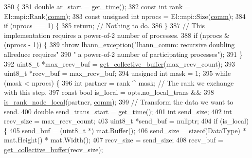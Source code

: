 \begin{DoxyCode}
380                                           \{
381   \textcolor{keywordtype}{double} ar\_start = \hyperlink{namespacelbann_a478d36031ff0659893c4322cd856157f}{get\_time}();
382   \textcolor{keyword}{const} \textcolor{keywordtype}{int} rank = El::mpi::Rank(\hyperlink{file__io_8cpp_ab048c6f9fcbcfaa57ce68b00263dbebe}{comm});
383   \textcolor{keyword}{const} \textcolor{keywordtype}{unsigned} \textcolor{keywordtype}{int} nprocs = El::mpi::Size(\hyperlink{file__io_8cpp_ab048c6f9fcbcfaa57ce68b00263dbebe}{comm});
384   \textcolor{keywordflow}{if} (nprocs == 1) \{
385     \textcolor{keywordflow}{return};  \textcolor{comment}{// Nothing to do.}
386   \}
387   \textcolor{comment}{// This implementation requires a power-of-2 number of processes.}
388   \textcolor{keywordflow}{if} (nprocs & (nprocs - 1)) \{
389     \textcolor{keywordflow}{throw} lbann\_exception(\textcolor{stringliteral}{"lbann\_comm: recursive doubling allreduce requires"}
390                           \textcolor{stringliteral}{" a power-of-2 number of participating processes"});
391   \}
392   uint8\_t *max\_recv\_buf = \hyperlink{classlbann_1_1lbann__comm_ae925ac5eaf2895717c709b252961b3bf}{get\_collective\_buffer}(max\_recv\_count);
393   uint8\_t *recv\_buf = max\_recv\_buf;
394   \textcolor{keywordtype}{unsigned} \textcolor{keywordtype}{int} mask = 1;
395   \textcolor{keywordflow}{while} (mask < nprocs) \{
396     \textcolor{keywordtype}{int} partner = rank ^ mask;  \textcolor{comment}{// The rank we exchange with this step.}
397     \textcolor{keyword}{const} \textcolor{keywordtype}{bool} is\_local = opts.no\_local\_trans &&
398                           \hyperlink{classlbann_1_1lbann__comm_a5cdd318d1505ba0f31bf4fe9fadffacc}{is\_rank\_node\_local}(partner, \hyperlink{file__io_8cpp_ab048c6f9fcbcfaa57ce68b00263dbebe}{comm});
399     \textcolor{comment}{// Transform the data we want to send.}
400     \textcolor{keywordtype}{double} send\_trans\_start = \hyperlink{namespacelbann_a478d36031ff0659893c4322cd856157f}{get\_time}();
401     \textcolor{keywordtype}{int} send\_size;
402     \textcolor{keywordtype}{int} recv\_size = max\_recv\_count;
403     uint8\_t *send\_buf = \textcolor{keyword}{nullptr};
404     \textcolor{keywordflow}{if} (is\_local) \{
405       send\_buf = (uint8\_t *) mat.Buffer();
406       send\_size = \textcolor{keyword}{sizeof}(DataType) * mat.Height() * mat.Width();
407       recv\_size = send\_size;
408       recv\_buf = \hyperlink{classlbann_1_1lbann__comm_ae925ac5eaf2895717c709b252961b3bf}{get\_collective\_buffer}(recv\_size);

\end{DoxyCode}
